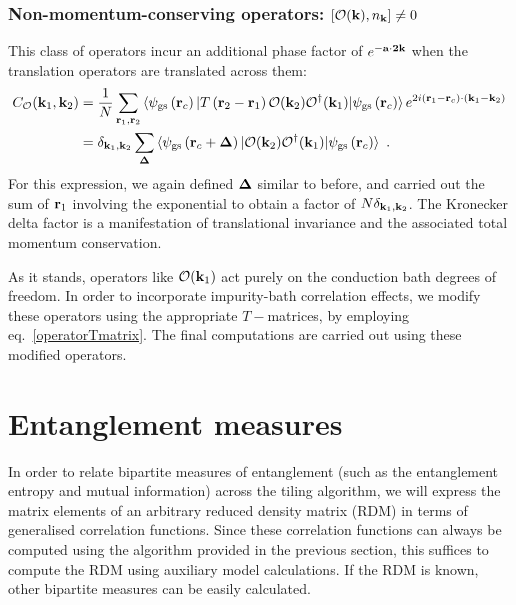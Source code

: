 \documentclass[reprint,hidelinks,onecolumn]{revtex4-2}
\begin{document}
\subsubsection{Non-momentum-conserving operators: \(\left[\mathcal{O}({\bf k}), n_{{\bf k}}\right] \neq 0\)}
This class of operators incur an additional phase factor of \(e^{-{\bf a}\cdot{\bf 2k}}\) when the translation operators are translated across them:
\begin{equation}\begin{aligned}
	C_{\mathcal{O}}({\bf k}_1,{\bf k}_2) &= \frac{1}{N}\sum_{{\bf r}_1,{\bf r}_2}\braket{\psi_\text{gs}\left({\bf r}_c\right) | T\left({\bf r}_2 - {\bf r}_1\right) \mathcal{O}({\bf k}_2)\mathcal{O}^\dagger({\bf k}_1) | \psi_\text{gs}\left({\bf r}_c\right)}e^{2i\left( {\bf r}_1 - {\bf r}_c \right) \cdot \left( {\bf k}_1 - {\bf k}_2 \right)} \\
										 &= \delta_{{\bf k}_1, {\bf k}_2}\sum_{{\bf \Delta}}\braket{\psi_\text{gs}\left({\bf r}_c + {\bf \Delta}\right) | \mathcal{O}({\bf k}_2)\mathcal{O}^\dagger({\bf k}_1) | \psi_\text{gs}\left({\bf r}_c\right)}~.
\end{aligned}\end{equation}
For this expression, we again defined \({\bf \Delta}\) similar to before, and carried out the sum of \({\bf r}_1\) involving the exponential to obtain a factor of \(N \delta_{{\bf k}_1, {\bf k}_2}\). The Kronecker delta factor is a manifestation of translational invariance and the associated total momentum conservation.

As it stands, operators like \(\mathcal{O}({\bf k}_1)\) act purely on the conduction bath degrees of freedom. In order to incorporate impurity-bath correlation effects, we modify these operators using the appropriate \(T-\)matrices, by employing eq.~\ref{operatorTmatrix}. The final computations are carried out using these modified operators.


\section{Entanglement measures}
In order to relate bipartite measures of entanglement (such as the entanglement entropy and mutual information) across the tiling algorithm, we will express the matrix elements of an arbitrary reduced density matrix (RDM) in terms of generalised correlation functions. Since these correlation functions can always be computed using the algorithm provided in the previous section, this suffices to compute the RDM using auxiliary model calculations. If the RDM is known, other bipartite measures can be easily calculated.
\end{document}
